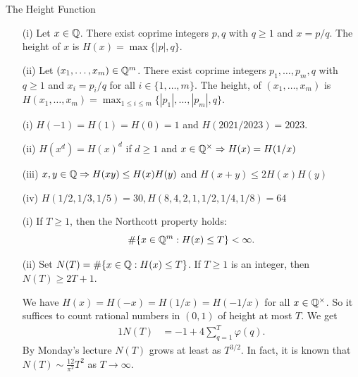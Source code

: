 \documentclass{beamer}
\begin{document}
\begin{frame}{The Height Function}
  \begin{definition}
    \begin{enumerate}
    \item [(i)]
      Let $x\in {\mathbb{Q}}$. There exist coprime integers $p,q$ with
      $q\ge 1$ and $x=p/q$. The \alert{height} of $x$ is $H(x)=\max\{|p|,q\}$.
    \item[(ii)] Let $(x_1,\ldots,x_m)\in{\mathbb{Q}}^m$. There exist coprime integers
      $p_1,\ldots,p_m,q$ with $q\ge 1$ and $x_i = p_i/q$ for all $i\in
      \{1,\ldots,m\}$.
      The  \alert{height},
      of $(x_1,\ldots,x_m)$ is $H(x_1,\ldots,x_m)
      = \max_{1\le i\le m} \{|p_1|,\ldots,|p_m|,q\}$.
    \end{enumerate}
  \end{definition}

  \begin{example}
  \begin{enumerate}
  \item [(i)] $H(-1)=H(1)=H(0)=1$ and $H(2021/2023) = 2023$.
  \item[(ii)] 
    $H(x^d)=H(x)^d$ if $d\ge 1$ and $x\in {\mathbb{Q}}^\times \Rightarrow H(x)=H(1/x)$ 

  \item[(iii)] $x,y\in{\mathbb{Q}}\Rightarrow H(xy)\le H(x)H(y)$ and $H(x+y)\le
    2H(x)H(y)$
  \item[(iv)] $H(1/2,1/3,1/5) = 30, H(8,4,2,1,1/2,1/4,1/8) = 64$
  \end{enumerate}  
  \end{example}
\end{frame}

\begin{frame}
  \begin{example}\label{ex:heightcount1}
    \begin{enumerate}
    \item [(i)] If $T\ge 1$, then the \alert{Northcott property} holds:  
      $$ \# \{ x\in {\mathbb{Q}}^m : H(x)\le T\} <\infty.$$

    \item[(ii)]
      Set $N(T) = \#\{x\in{\mathbb{Q}} : H(x)\le T\}$.
      If $T\ge 1$ is an integer, then $N(T) \ge 2T+1$.

      We have
      $H(x)=H(-x)=H(1/x)=H(-1/x)$ for all
      $x\in{\mathbb{Q}}^\times$. So it suffices to count rational numbers in
      $(0,1)$ of height at most $T$. We get
      \begin{alignat*}1
        N(T) 
        &= -1+4\sum_{q=1}^T \varphi(q).
      \end{alignat*}
      By Monday's lecture
      $N(T)$ grows at least as $T^{3/2}$. In fact, it is known that
      $N(T)\sim \frac{12}{\pi^2} T^2$ as $T\rightarrow\infty$.
    \end{enumerate}
  \end{example}
\end{frame}
\end{document}
